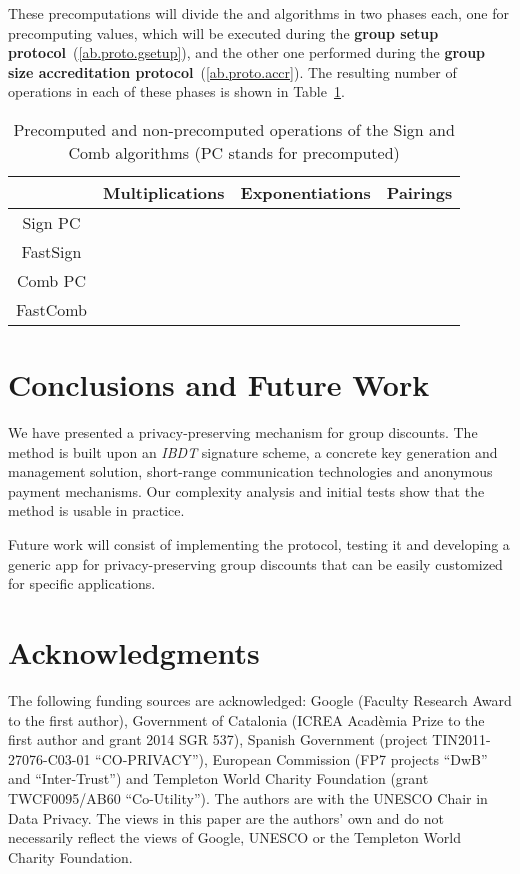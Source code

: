 \documentclass[11pt]{llncs}
\begin{document}
These precomputations will divide the  and 
algorithms in two phases each, one for precomputing
values, which will be executed during the \textbf{group setup protocol}~(\ref{ab.proto.gsetup}),
and the other one performed during the \textbf{group size accreditation protocol}~(\ref{ab.proto.accr}).
The resulting number of operations in each of
these phases is shown in Table~\ref{ab.tab.ibdttimesprec}.

\begin{table}[!h]
\renewcommand{\arraystretch}{1.3}
\caption{Precomputed and non-precomputed
operations of the Sign and Comb algorithms (PC stands for
precomputed)} \label{ab.tab.ibdttimesprec}
\centering
\begin{tabular}{c||c||c||c}
\hline
& \bfseries Multiplications & \bfseries Exponentiations & \bfseries Pairings \\
\hline
\hline
Sign PC &  &  &  \\
FastSign &  &  &  \\
Comb PC &  &  &  \\
FastComb &  &  &  \\
\hline
\end{tabular}
\end{table}




\section{Conclusions and Future Work} \label{ab.sec.conclusions}
We have presented a privacy-preserving
mechanism for group discounts.
The method is built upon an \emph{IBDT} signature scheme,
a concrete key generation and management solution, short-range
communication technologies and anonymous payment mechanisms.
Our complexity analysis and initial tests show that the method 
is usable in practice.

Future work will consist of implementing
the protocol, testing it and 
developing a generic app for privacy-preserving group discounts that can be easily
customized for specific applications.


\section*{Acknowledgments}
The following funding sources are acknowledged:
Google (Faculty Research Award to the first author), 
Government of Catalonia (ICREA Acad\`emia Prize to the 
first author and grant 2014 SGR 537),
Spanish Government (project TIN2011-27076-C03-01 ``CO-PRIVACY''),
European Commission (FP7 projects
``DwB'' and ``Inter-Trust'') and Templeton World Charity
Foundation (grant TWCF0095/AB60 ``Co-Utility'').
The authors are with the UNESCO Chair in Data Privacy.
The views in this paper are the authors' own and 
do not necessarily reflect
the views of Google, UNESCO or the Templeton World Charity
Foundation.
\end{document}

